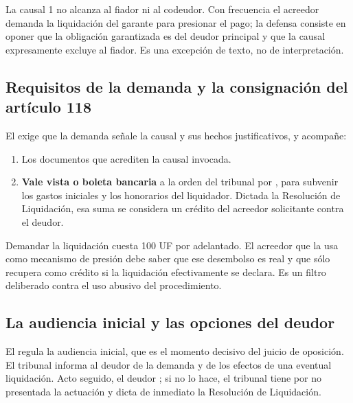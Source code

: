 \begin{foco}
La causal 1 no alcanza al fiador ni al codeudor. Con frecuencia el acreedor demanda la
liquidación del garante para presionar el pago; la defensa consiste en oponer que la
obligación garantizada es del deudor principal y que la causal expresamente excluye al
fiador. Es una excepción de texto, no de interpretación.
\end{foco}

\subsection{Requisitos de la demanda y la consignación del artículo 118}

El  exige que la demanda señale la causal y sus hechos justificativos, y acompañe:

\begin{enumerate}
  \item Los documentos que acrediten la causal invocada.
  \item \textbf{Vale vista o boleta bancaria} a la orden del tribunal por
  , para subvenir los gastos iniciales y los honorarios
  del liquidador. Dictada la Resolución de Liquidación, esa suma se considera un crédito del
  acreedor solicitante contra el deudor.
\end{enumerate}

\begin{alerta}
Demandar la liquidación cuesta 100 UF por adelantado. El acreedor que la usa como mecanismo
de presión debe saber que ese desembolso es real y que sólo recupera como crédito si la
liquidación efectivamente se declara. Es un filtro deliberado contra el uso abusivo del
procedimiento.
\end{alerta}

\subsection{La audiencia inicial y las opciones del deudor}

El  regula la audiencia inicial, que es el momento decisivo del juicio de
oposición. El tribunal informa al deudor de la demanda y de los efectos de una eventual
liquidación. Acto seguido, el deudor ; si no lo hace, el tribunal tiene por
no presentada la actuación y dicta de inmediato la Resolución de Liquidación.

